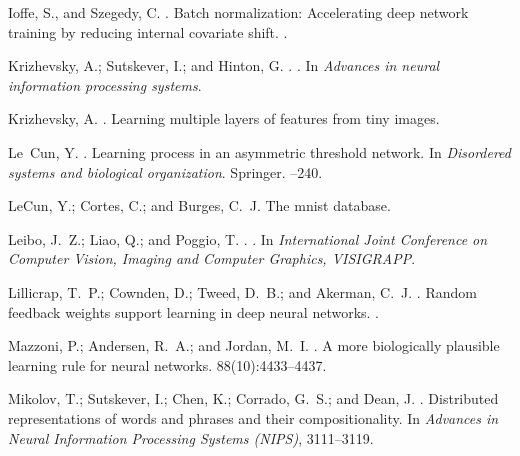 \documentclass[letterpaper]{article}
\begin{document}
\begin{thebibliography}{}
Ioffe, S., and Szegedy, C.
.
\newblock Batch normalization: Accelerating deep network training by reducing
  internal covariate shift.
.

Krizhevsky, A.; Sutskever, I.; and Hinton, G.
.
.
\newblock In {\em Advances in neural information processing systems}.

Krizhevsky, A.
.
\newblock Learning multiple layers of features from tiny images.

Le~Cun, Y.
.
\newblock Learning process in an asymmetric threshold network.
\newblock In {\em Disordered systems and biological organization}. Springer.
--240.

LeCun, Y.; Cortes, C.; and Burges, C.~J.
\newblock The mnist database.

Leibo, J.~Z.; Liao, Q.; and Poggio, T.
.
.
\newblock In {\em International Joint Conference on Computer Vision, Imaging
  and Computer Graphics, VISIGRAPP}.

Lillicrap, T.~P.; Cownden, D.; Tweed, D.~B.; and Akerman, C.~J.
.
\newblock Random feedback weights support learning in deep neural networks.
.

Mazzoni, P.; Andersen, R.~A.; and Jordan, M.~I.
.
\newblock A more biologically plausible learning rule for neural networks.
  88(10):4433--4437.

Mikolov, T.; Sutskever, I.; Chen, K.; Corrado, G.~S.; and Dean, J.
.
\newblock Distributed representations of words and phrases and their
  compositionality.
\newblock In {\em Advances in Neural Information Processing Systems (NIPS)},
  3111--3119.


\end{thebibliography}
\end{document}
